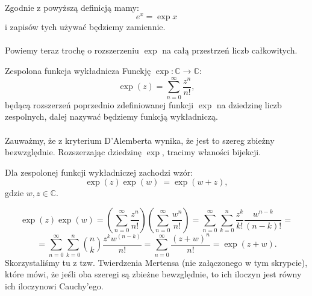 \documentclass{article}
\newcounter{defi}
\numberwithin{defi}{section}
\numberwithin{defi}{section}
\newcommand{\C}{\mathbb{C}}
\newcommand{\oo}{\infty}
\begin{document}
\paragraph{} Zgodnie z powyższą definicją mamy: \begin{equation}
    e ^ x = \exp x
\end{equation} i zapisów tych używać będziemy zamiennie.

\paragraph{} Powiemy teraz trochę o rozszerzeniu $\exp$ na całą przestrzeń liczb całkowitych.

\begin{defr}{Zespolona funkcja wykładnicza}
    Funckję $\exp: \C \to \C$: \begin{equation}
        \exp(z) = \sum_{n = 0}^{\oo} \frac{z ^ n}{n!},
    \end{equation} będącą rozszerzeń poprzednio zdefiniowanej funkcji $\exp$ na dziedzinę liczb zespolnych, dalej nazywać będziemy funkcją wykładniczą.
\end{defr}
\paragraph{} Zauważmy, że z kryterium D'Alemberta wynika, że jest to szereg zbieżny bezwzględnie. Rozszerzając dziedzinę $\exp$, tracimy właności bijekcji.

\begin{twier}{}
    Dla zespolonej funkcji wykładniczej zachodzi wzór: \begin{equation}
        \exp(z) \exp(w) \ = \exp(w + z),
    \end{equation} gdzie $w, z \in \C$.
\end{twier}


\begin{dow}{}
    \begin{equation}
        \exp(z) \exp(w) = (\sum_{n = 0}^{\oo} \frac{z ^ n}{n!}) ( \sum_{n = 0}^{\oo} \frac{w ^ n}{n!}) = \sum_{n = 0}^{\oo} \sum_{k = 0}^{n} \frac{z^k}{ k!} \frac{w ^{n - k}}{(n - k)!} =
    \end{equation} \begin{equation}
        = \sum_{n = 0}^{\oo} \sum_{k = 0}^{n} \binom{n}{k}\frac{z^k w ^ (n - k)}{n!} = \sum_{n = 0}^{\oo} \frac{(z + w) ^ n}{ n!} = \exp( z + w).
    \end{equation}
    Skorzystaliśmy tu z tzw. Twierdzenia Mertensa (nie załączonego w tym skrypcie), które mówi, że jeśli oba szeregi są zbieżne bewzględnie, to ich iloczyn jest równy ich iloczynowi Cauchy'ego.
\end{dow}
\end{document}
